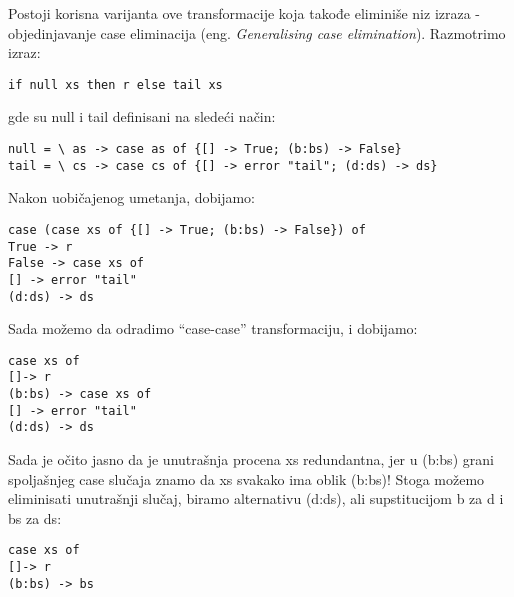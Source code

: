 Postoji korisna varijanta ove transformacije koja takođe eliminiše niz izraza - objedinjavanje case eliminacija (eng. \emph{Generalising case elimination}). Razmotrimo izraz:
\begin{verbatim}
if null xs then r else tail xs
\end{verbatim}
gde su null i tail definisani na sledeći način:
\begin{verbatim}
null = \ as -> case as of {[] -> True; (b:bs) -> False}
tail = \ cs -> case cs of {[] -> error "tail"; (d:ds) -> ds}
\end{verbatim}
Nakon uobičajenog umetanja, dobijamo:
\begin{verbatim}
case (case xs of {[] -> True; (b:bs) -> False}) of
True -> r
False -> case xs of
[] -> error "tail"
(d:ds) -> ds
\end{verbatim}
Sada možemo da odradimo “case-case” transformaciju, i dobijamo:
\begin{verbatim}
case xs of
[]-> r
(b:bs) -> case xs of
[] -> error "tail"
(d:ds) -> ds
\end{verbatim}
Sada je očito jasno da je unutrašnja procena xs redundantna, jer u (b:bs) grani spoljašnjeg case slučaja znamo da xs svakako ima 
oblik (b:bs)! Stoga možemo eliminisati unutrašnji slučaj, biramo alternativu (d:ds), ali supstitucijom b za d i bs za ds: 
\begin{verbatim}
case xs of
[]-> r
(b:bs) -> bs
\end{verbatim}

